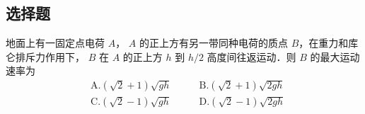 
\subsection{选择题}
地面上有一固定点电荷 $A$， $A$ 的正上方有另一带同种电荷的质点 $B$，在重力和库仑排斥力作用下， $B$ 在 $A$ 的正上方 $h$ 到 $h/2$ 高度间往返运动．则 $B$ 的最大运动速率为\\
\begin{equation}
\begin{aligned}
&\mathrm{A}. (\sqrt{2}+1) \sqrt{g h}\qquad
&\mathrm{B}. (\sqrt{2}+1) \sqrt{2 g h}\\
&\mathrm{C}. (\sqrt{2}-1) \sqrt{g h}\quad
&\mathrm{D}. (\sqrt{2}-1) \sqrt{2 g h}
\end{aligned}
\end{equation}
